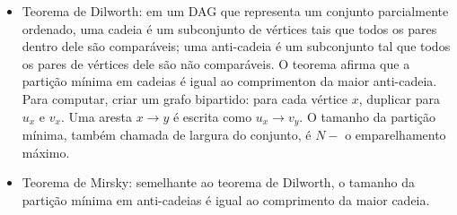 \begin{itemize}
\item Teorema de Dilworth: em um DAG que representa um conjunto parcialmente ordenado, uma cadeia é um subconjunto de vértices tais que todos os pares dentro dele são comparáveis; uma anti-cadeia é um subconjunto tal que todos os pares de vértices dele são não comparáveis. O teorema afirma que a partição mínima em cadeias é igual ao comprimenton da maior anti-cadeia. Para computar, criar um grafo bipartido: para cada vértice $x$, duplicar para $u_x$ e $v_x$. Uma aresta $x \rightarrow y$ é escrita como $u_x \rightarrow v_y$. O tamanho da partição mínima, também chamada de largura do conjunto, é $N-$ o emparelhamento máximo.
\item Teorema de Mirsky: semelhante ao teorema de Dilworth, o tamanho da partição mínima em anti-cadeias é igual ao comprimento da maior cadeia.
\end{itemize}

